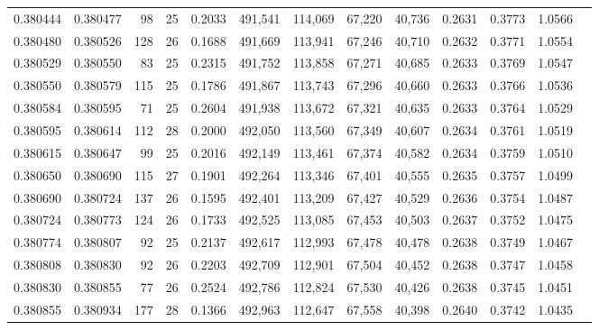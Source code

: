 \begin{tabular}{rrrrrrrrrrrrr}
0.380444 & 0.380477 &    98 &  25 &                                     0.2033 & 491,541 & 114,069 &  67,220 &  40,736 & 0.2631 & 0.3773 & 1.0566 \\
0.380480 & 0.380526 &   128 &  26 &                                     0.1688 & 491,669 & 113,941 &  67,246 &  40,710 & 0.2632 & 0.3771 & 1.0554 \\
0.380529 & 0.380550 &    83 &  25 &                                     0.2315 & 491,752 & 113,858 &  67,271 &  40,685 & 0.2633 & 0.3769 & 1.0547 \\
0.380550 & 0.380579 &   115 &  25 &                                     0.1786 & 491,867 & 113,743 &  67,296 &  40,660 & 0.2633 & 0.3766 & 1.0536 \\
0.380584 & 0.380595 &    71 &  25 &                                     0.2604 & 491,938 & 113,672 &  67,321 &  40,635 & 0.2633 & 0.3764 & 1.0529 \\
0.380595 & 0.380614 &   112 &  28 &                                     0.2000 & 492,050 & 113,560 &  67,349 &  40,607 & 0.2634 & 0.3761 & 1.0519 \\
0.380615 & 0.380647 &    99 &  25 &                                     0.2016 & 492,149 & 113,461 &  67,374 &  40,582 & 0.2634 & 0.3759 & 1.0510 \\
0.380650 & 0.380690 &   115 &  27 &                                     0.1901 & 492,264 & 113,346 &  67,401 &  40,555 & 0.2635 & 0.3757 & 1.0499 \\
0.380690 & 0.380724 &   137 &  26 &                                     0.1595 & 492,401 & 113,209 &  67,427 &  40,529 & 0.2636 & 0.3754 & 1.0487 \\
0.380724 & 0.380773 &   124 &  26 &                                     0.1733 & 492,525 & 113,085 &  67,453 &  40,503 & 0.2637 & 0.3752 & 1.0475 \\
0.380774 & 0.380807 &    92 &  25 &                                     0.2137 & 492,617 & 112,993 &  67,478 &  40,478 & 0.2638 & 0.3749 & 1.0467 \\
0.380808 & 0.380830 &    92 &  26 &                                     0.2203 & 492,709 & 112,901 &  67,504 &  40,452 & 0.2638 & 0.3747 & 1.0458 \\
0.380830 & 0.380855 &    77 &  26 &                                     0.2524 & 492,786 & 112,824 &  67,530 &  40,426 & 0.2638 & 0.3745 & 1.0451 \\
0.380855 & 0.380934 &   177 &  28 &                                     0.1366 & 492,963 & 112,647 &  67,558 &  40,398 & 0.2640 & 0.3742 & 1.0435 \\

\end{tabular}
